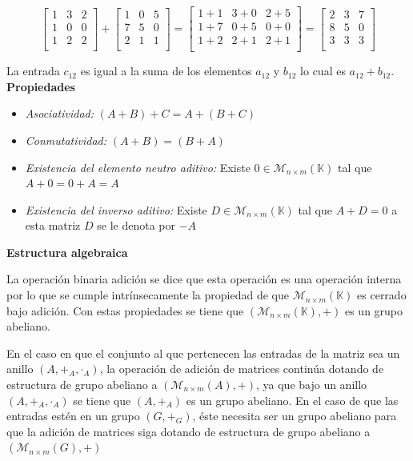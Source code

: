 \documentclass[10pt]{article}
\begin{document}
$$
\begin{bmatrix}
1 & 3 & 2 \\
1 & 0 & 0 \\
1 & 2 & 2 \\
\end{bmatrix}
+
\begin{bmatrix}
1 & 0 & 5 \\
7 & 5 & 0 \\
2 & 1 & 1 \\
\end{bmatrix}
=
\begin{bmatrix}
1+1 & 3+0 & 2+5 \\
1+7 & 0+5 & 0+0 \\
1+2 & 2+1 & 2+1 \\
\end{bmatrix}
=
\begin{bmatrix}
2 & 3 & 7 \\
8 & 5 & 0 \\
3 & 3 & 3 \\
\end{bmatrix}
$$

La entrada $c_{12}$ es igual a la suma de los elementos $a_{12}$ y $b_{12}$ lo cual es $a_{12} + b_{12}$. \\

\noindent\textbf{Propiedades}

\begin{itemize}
\item \textit{Asociatividad:} $( A + B) + C = A + (B + C)$
\item \textit{Conmutatividad:} $(A + B) = (B + A)$
\item \textit{Existencia del elemento neutro aditivo:} Existe $0\in \mathcal{M}_{n\times {m}}(\mathbb{K})$ tal que $A + 0 = 0 + A = A$
\item \textit{Existencia del inverso aditivo:} Existe $D\in \mathcal{M}_{n\times {m}}(\mathbb{K})$ tal que $A + D = 0$ a esta matriz $D$ se le denota por $-A$
\end{itemize}

\noindent\textbf{Estructura algebraica}

La operación binaria adición se dice que esta operación es una operación interna por lo que se cumple intrínsecamente la propiedad de que $\mathcal{M}_{n\times {m}}(\mathbb{K})$ es cerrado bajo adición. Con estas propiedades se tiene que $(\mathcal{M}_{n\times {m}}(\mathbb{K}), + )$ es un grupo abeliano.

En el caso en que el conjunto al que pertenecen las entradas de la matriz sea un anillo $(A, +_A, \cdot{_A})$, la operación de adición de matrices continúa dotando de estructura de grupo abeliano a $(\mathcal{M}_{n\times {m}}(A), +)$, ya que bajo un anillo $(A, +_A, \cdot{_A})$ se tiene que $(A, +_A)$ es un grupo abeliano. En el caso de que las entradas estén en un grupo $(G, +_G)$, éste necesita ser un grupo abeliano para que la adición de matrices siga dotando de estructura de grupo abeliano a $(\mathcal{M}_{n\times {m}}(G), +)$ \\
\end{document}
